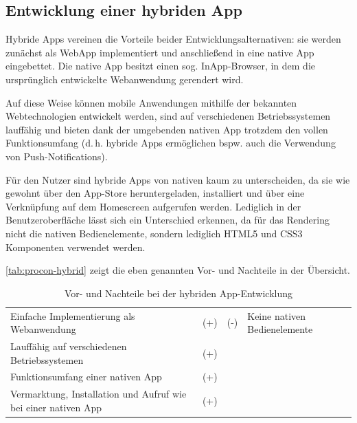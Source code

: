 \subsection{Entwicklung einer hybriden App}\label{kapitel:procon-hybrid}
Hybride Apps vereinen die Vorteile beider Entwicklungsalternativen: sie werden zunächst als WebApp implementiert und anschließend in eine native App eingebettet. Die native App besitzt einen sog. InApp-Browser, in dem die ursprünglich entwickelte Webanwendung gerendert wird.

Auf diese Weise können mobile Anwendungen mithilfe der bekannten Webtechnologien entwickelt werden, sind auf verschiedenen Betriebssystemen lauffähig und bieten dank der umgebenden nativen App trotzdem den vollen Funktionsumfang (d.\,h. hybride Apps ermöglichen bspw. auch die Verwendung von Push-Notifications).

Für den Nutzer sind hybride Apps von nativen kaum zu unterscheiden, da sie wie gewohnt über den App-Store heruntergeladen, installiert und über eine Verknüpfung auf dem Homescreen aufgerufen werden. Lediglich in der Benutzeroberfläche lässt sich ein Unterschied erkennen, da für das Rendering nicht die nativen Bedienelemente, sondern lediglich HTML5 und CSS3 Komponenten verwendet werden.

\vref*{tab:procon-hybrid} zeigt die eben genannten Vor- und Nachteile in der Übersicht.

\begin{table}[H]
  \begin{center}\small\renewcommand{\arraystretch}{1.4}\sffamily %
    \begin{tabulary}{\textwidth}{>{\raggedleft}m{61mm} *{2}{>{\ttfamily}m{5mm}} m{61mm}}
    	&	\\ \hline
    
    Einfache Implementierung als Webanwendung & (+) &
    (-) & Keine nativen Bedienelemente\\
    
    Lauffähig auf verschiedenen Betriebssystemen & (+) & & \\
    
    Funktionsumfang einer nativen App & (+) & & \\
    
    Vermarktung, Installation und Aufruf wie bei einer nativen App & (+) & &\\

    \end{tabulary}        
    
    \caption{Vor- und Nachteile bei der hybriden App-Entwicklung}
    \label{tab:procon-hybrid}
  \end{center}
\end{table}


